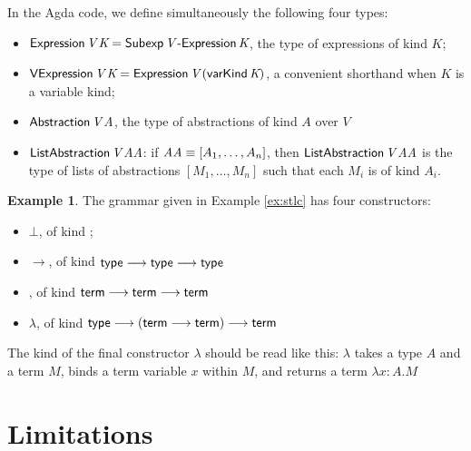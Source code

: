 \documentclass{article}
\theoremstyle{definition}
\newtheorem{example}{Example}[section]
\begin{document}
In the Agda code, we define simultaneously the following four types:
\begin{itemize}
 \item $\AgdaFunction{Expression} \, \AgdaBound{V} \, \AgdaBound{K} = \AgdaDatatype{Subexp} \, \AgdaBound{V} \, \AgdaInductiveConstructor{-Expression} \, \AgdaBound{K}$,
the type of expressions of kind $K$;
\item $\AgdaFunction{VExpression} \, \AgdaBound{V} \, \AgdaBound{K} = \AgdaFunction{Expression} \,
\AgdaBound{V} \, (\AgdaInductiveConstructor{varKind} \, \AgdaBound{K})$, a convenient
shorthand when $K$ is a variable kind;
\item $\AgdaFunction{Abstraction} \, \AgdaBound{V} \, \AgdaBound{A}$, the type of abstractions
of kind $A$ over $V$
\item $\AgdaFunction{ListAbstraction} \, \AgdaBound{V} \, \AgdaBound{AA}$: if $\AgdaBound{AA} \equiv [ A_1, \ldots, A_n ]$,
then $\AgdaFunction{ListAbstraction} \, \AgdaBound{V} \, \AgdaBound{AA}$ is the type of lists of abstractions $[M_1, \ldots, M_n]$
such that each $M_i$ is of kind $A_i$.
\end{itemize}


\begin{example}
The grammar given in Example \ref{ex:stlc} has four constructors:
\begin{itemize}
 \item
$\bot$, of kind ;
\item
$\rightarrow$, of kind $\AgdaFunction{type} \longrightarrow \AgdaFunction{type} \longrightarrow \AgdaFunction{type}$
\item
{}, of kind $\AgdaFunction{term} \longrightarrow \AgdaFunction{term} \longrightarrow \AgdaFunction{term}$
\item
$\lambda$, of kind $\AgdaFunction{type} \longrightarrow (\AgdaFunction{term} \longrightarrow \AgdaFunction{term}) \longrightarrow \AgdaFunction{term}$
\end{itemize}
The kind of the final constructor $\lambda$ should be read like this: $\lambda$ takes a type $A$
and a term $M$, binds a term variable $x$ within $M$, and returns a term $\lambda x:A.M$

\end{example}

\section{Limitations}
\end{document}
